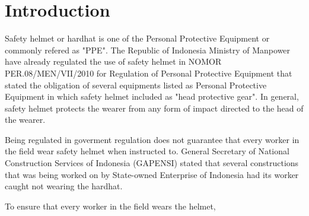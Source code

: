 \section{Introduction}
\label{sec:introduction}


\par Safety helmet or hardhat is one of the Personal Protective Equipment or commonly refered as "PPE".
 The Republic of Indonesia Ministry of Manpower have already regulated the use of safety helmet
 in NOMOR PER.08/MEN/VII/2010 for Regulation of Personal Protective Equipment that stated the obligation
 of several equipments listed as Personal Protective Equipment in which safety helmet included as "head protective gear".
 In general, safety helmet protects the wearer from any form of impact directed to the head of the wearer.

 \par Being regulated in goverment regulation does not guarantee that every worker
 in the field wear safety helmet when instructed to. General Secretary of National Construction Services of Indonesia
 (GAPENSI) stated that several constructions that was being worked on by State-owned Enterprise of Indonesia
 had its worker caught not wearing the hardhat. 

 \par To ensure that every worker in the field wears the helmet, 